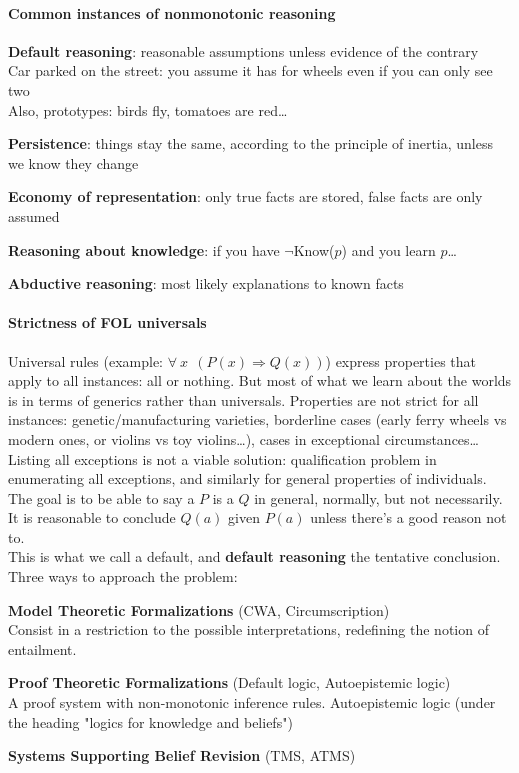 \documentclass[10pt]{report}
\begin{document}
\paragraph{Common instances of nonmonotonic reasoning} \begin{list}{}{}
	\item \textbf{Default reasoning}: reasonable assumptions unless evidence of the contrary\\
	Car parked on the street: you assume it has for wheels even if you can only see two\\
	Also, prototypes: birds fly, tomatoes are red\ldots
	\item \textbf{Persistence}: things stay the same, according to the principle of inertia, unless we know they change
	\item \textbf{Economy of representation}: only true facts are stored, false facts are only assumed
	\item \textbf{Reasoning about knowledge}: if you have $\neg$Know($p$) and you learn $p$\ldots
	\item \textbf{Abductive reasoning}: most likely explanations to known facts
\end{list}
\paragraph{Strictness of FOL universals} Universal rules (example: $\forall\:x\:\:(P(x)\Rightarrow Q(x))$) express properties that apply to all instances: all or nothing. But most of what we learn about the worlds is in terms of generics rather than universals. Properties are not strict for all instances: genetic/manufacturing varieties, borderline cases (early ferry wheels vs modern ones, or violins vs toy violins\ldots), cases in exceptional circumstances\ldots\\
Listing all exceptions is not a viable solution: qualification problem in enumerating all exceptions, and similarly for general properties of individuals. The goal is to be able to say a $P$ is a $Q$ in general, normally, but not necessarily. It is reasonable to conclude $Q(a)$ given $P(a)$ unless there's a good reason not to.\\
This is what we call a default, and \textbf{default reasoning} the tentative conclusion. Three ways to approach the problem:
\begin{list}{}{}
	\item \textbf{Model Theoretic Formalizations} (CWA, Circumscription)\\
	Consist in a restriction to the possible interpretations, redefining the notion of entailment.
	\item \textbf{Proof Theoretic Formalizations} (Default logic, Autoepistemic logic)\\
	A proof system with non-monotonic inference rules. Autoepistemic logic (under the heading "logics for knowledge and beliefs")
	\item \textbf{Systems Supporting Belief Revision} (TMS, ATMS)
\end{list}
\end{document}
